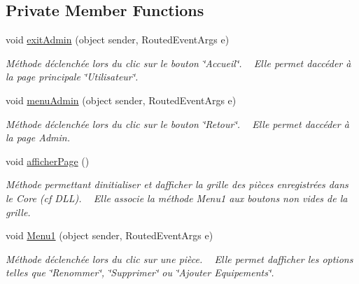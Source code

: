 \subsection*{Private Member Functions}
\begin{DoxyCompactItemize}
\item 
void \hyperlink{class_my_domotik_1_1_gestion_pieces_a6a74493d99b00d1213ac9da94d1e98b3}{exit\+Admin} (object sender, Routed\+Event\+Args e)
\begin{DoxyCompactList}\small\item\em Méthode déclenchée lors du clic sur le bouton \char`\"{}\+Accueil\char`\"{}. ~\newline
Elle permet d\textquotesingle{}accéder à la page principale \char`\"{}\+Utilisateur\char`\"{}. \end{DoxyCompactList}\item 
void \hyperlink{class_my_domotik_1_1_gestion_pieces_a11bc8bd6ad99c1f9c56609e121be1e07}{menu\+Admin} (object sender, Routed\+Event\+Args e)
\begin{DoxyCompactList}\small\item\em Méthode déclenchée lors du clic sur le bouton \char`\"{}\+Retour\char`\"{}. ~\newline
Elle permet d\textquotesingle{}accéder à la page Admin. \end{DoxyCompactList}\item 
void \hyperlink{class_my_domotik_1_1_gestion_pieces_a55b382336deb3025ebea60b5c8de1170}{afficher\+Page} ()
\begin{DoxyCompactList}\small\item\em Méthode permettant d\textquotesingle{}initialiser et d\textquotesingle{}afficher la grille des pièces enregistrées dans le Core (cf D\+LL). ~\newline
Elle associe la méthode Menu1 aux boutons non vides de la grille. ~\newline
\end{DoxyCompactList}\item 
void \hyperlink{class_my_domotik_1_1_gestion_pieces_a155472278ec2a8a04f0c184e05d527a3}{Menu1} (object sender, Routed\+Event\+Args e)
\begin{DoxyCompactList}\small\item\em Méthode déclenchée lors du clic sur une pièce. ~\newline
Elle permet d\textquotesingle{}afficher les options telles que \char`\"{}\+Renommer\char`\"{}, \char`\"{}\+Supprimer\char`\"{} ou \char`\"{}\+Ajouter Equipements\char`\"{}. \end{DoxyCompactList}\item 

\end{DoxyCompactItemize}
